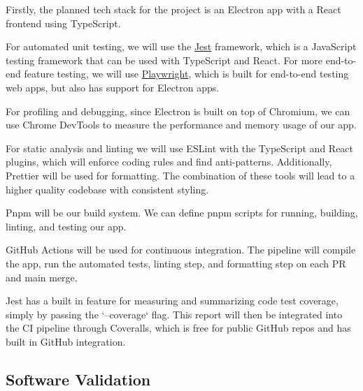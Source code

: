 \documentclass[12pt, titlepage]{article}
\begin{document}
Firstly, the planned tech stack for the project is an Electron app with a
React frontend using TypeScript.

For automated unit testing, we will use the \href{https://jestjs.io/}{Jest}
framework, which is a JavaScript testing framework that can be used with
TypeScript and React. For more end-to-end feature testing, we will use
\href{https://playwright.dev/}{Playwright}, which is built for end-to-end
testing web apps, but also has support for Electron apps.

For profiling and debugging, since Electron is built on top of Chromium, we can
use Chrome DevTools to measure the performance and memory usage of our app.

For static analysis and linting we will use ESLint with the TypeScript and
React plugins, which will enforce coding rules and find anti-patterns.
Additionally, Prettier will be used for formatting. The combination of these
tools will lead to a higher quality codebase with consistent styling.

Pnpm will be our build system. We can define pnpm scripts for running,
building, linting, and testing our app.

GitHub Actions will be used for continuous integration. The pipeline will
compile the app, run the automated tests, linting step, and formatting step on
each PR and main merge.

Jest has a built in feature for measuring and summarizing code test coverage,
simply by passing the `--coverage` flag. This report will then be integrated
into the CI pipeline through Coveralls, which is free for public GitHub repos
and has built in GitHub integration.

\subsection{Software Validation}



\end{document}

